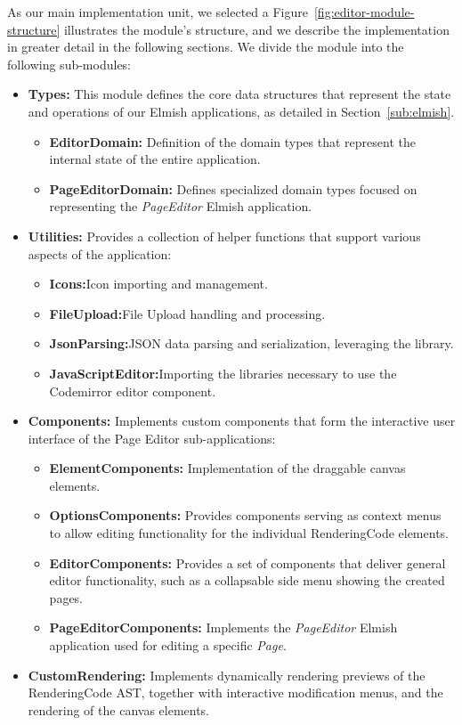 As our main implementation unit, we selected a
Figure~\ref{fig:editor-module-structure} illustrates the module's structure, and we describe the implementation in greater detail in the following sections.
We divide the module into the following sub-modules:
\begin{itemize}
	\item \textbf{Types:} This module defines the core data structures that represent the state and operations of our Elmish applications, as detailed in Section~\ref{sub:elmish}.
	      \begin{itemize}
		      \item \textbf{EditorDomain:} Definition of the domain types that represent the internal state of the entire application.
		      \item \textbf{PageEditorDomain:} Defines specialized domain types focused on representing the \emph{PageEditor} Elmish application.
	      \end{itemize}

	\item \textbf{Utilities:} Provides a collection of helper functions that support various aspects of the application:
	      \begin{itemize}
		      \item \textbf{Icons:}Icon importing and management.
		      \item \textbf{FileUpload:}File Upload handling and processing.
		      \item \textbf{JsonParsing:}JSON data parsing and serialization, leveraging the \citet{simpleJson} library.
		      \item \textbf{JavaScriptEditor:}Importing the libraries necessary to use the Codemirror editor component.
	      \end{itemize}


	\item \textbf{Components:} Implements custom components that form the interactive user interface of the Page Editor sub-applications:
	      \begin{itemize}
		      \item \textbf{ElementComponents:} Implementation of the draggable canvas elements.
		      \item \textbf{OptionsComponents:} Provides components serving as context menus to allow editing functionality for the individual RenderingCode elements.
		      \item \textbf{EditorComponents:} Provides a set of components that deliver general editor functionality, such as a collapsable side menu showing the created pages.
		      \item \textbf{PageEditorComponents:} Implements the \emph{PageEditor} Elmish application used for editing a specific \emph{Page}.
	      \end{itemize}
	\item \textbf{CustomRendering:} Implements dynamically rendering previews of the RenderingCode AST, together with interactive modification menus, and the rendering of the canvas elements.
\end{itemize}


